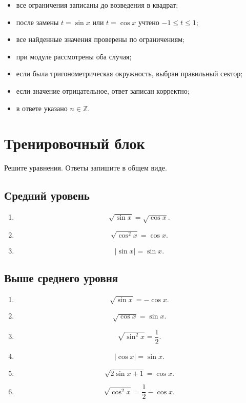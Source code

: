 \documentclass[a4paper,12pt]{article}
\newcommand{\Z}{\mathbb{Z}}
\begin{document}
\begin{itemize}
  \item все ограничения записаны до возведения в квадрат;
  \item после замены \(t=\sin x\) или \(t=\cos x\) учтено \(-1\le t\le1\);
  \item все найденные значения проверены по ограничениям;
  \item при модуле рассмотрены оба случая;
  \item если была тригонометрическая окружность, выбран правильный сектор;
  \item если значение отрицательное, ответ записан корректно;
  \item в ответе указано \(n\in\Z\).
\end{itemize}

\newpage

\section*{Тренировочный блок}

Решите уравнения. Ответы запишите в общем виде.

\subsection*{Средний уровень}

\begin{enumerate}
  \item
  \[
  \sqrt{\sin x}=\sqrt{\cos x}.
  \]

  \item
  \[
  \sqrt{\cos^2x}=\cos x.
  \]

  \item
  \[
  |\sin x|=\sin x.
  \]
\end{enumerate}

\subsection*{Выше среднего уровня}

\begin{enumerate}[resume]
  \item
  \[
  \sqrt{\sin x}=-\cos x.
  \]

  \item
  \[
  \sqrt{\cos x}=\sin x.
  \]

  \item
  \[
  \sqrt{\sin^2x}=\frac12.
  \]

  \item
  \[
  |\cos x|=\sin x.
  \]

  \item
  \[
  \sqrt{2\sin x+1}=\cos x.
  \]

  \item
  \[
  \sqrt{\cos^2x}=\frac12-\cos x.
  \]
\end{enumerate}
\end{document}
